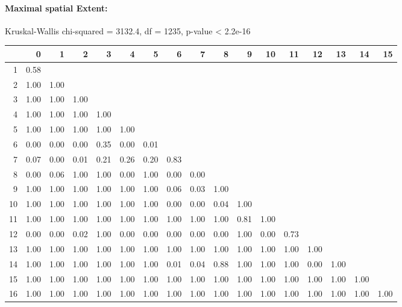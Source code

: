 \paragraph{Maximal spatial Extent:}
Kruskal-Wallis chi-squared = 3132.4, df = 1235, p-value < 2.2e-16

% 
\begin{tabular}{rrrrrrrrrrrrrrrrr}
  \hline
 & 0 & 1 & 2 & 3 & 4 & 5 & 6 & 7 & 8 & 9 & 10 & 11 & 12 & 13 & 14 & 15 \\ 
  \hline
1 & 0.58 &  &  &  &  &  &  &  &  &  &  &  &  &  &  &  \\ 
  2 & 1.00 & 1.00 &  &  &  &  &  &  &  &  &  &  &  &  &  &  \\ 
  3 & 1.00 & 1.00 & 1.00 &  &  &  &  &  &  &  &  &  &  &  &  &  \\ 
  4 & 1.00 & 1.00 & 1.00 & 1.00 &  &  &  &  &  &  &  &  &  &  &  &  \\ 
  5 & 1.00 & 1.00 & 1.00 & 1.00 & 1.00 &  &  &  &  &  &  &  &  &  &  &  \\ 
  6 & 0.00 & 0.00 & 0.00 & 0.35 & 0.00 & 0.01 &  &  &  &  &  &  &  &  &  &  \\ 
  7 & 0.07 & 0.00 & 0.01 & 0.21 & 0.26 & 0.20 & 0.83 &  &  &  &  &  &  &  &  &  \\ 
  8 & 0.00 & 0.06 & 1.00 & 1.00 & 0.00 & 1.00 & 0.00 & 0.00 &  &  &  &  &  &  &  &  \\ 
  9 & 1.00 & 1.00 & 1.00 & 1.00 & 1.00 & 1.00 & 0.06 & 0.03 & 1.00 &  &  &  &  &  &  &  \\ 
  10 & 1.00 & 1.00 & 1.00 & 1.00 & 1.00 & 1.00 & 0.00 & 0.00 & 0.04 & 1.00 &  &  &  &  &  &  \\ 
  11 & 1.00 & 1.00 & 1.00 & 1.00 & 1.00 & 1.00 & 1.00 & 1.00 & 1.00 & 0.81 & 1.00 &  &  &  &  &  \\ 
  12 & 0.00 & 0.00 & 0.02 & 1.00 & 0.00 & 0.00 & 0.00 & 0.00 & 0.00 & 1.00 & 0.00 & 0.73 &  &  &  &  \\ 
  13 & 1.00 & 1.00 & 1.00 & 1.00 & 1.00 & 1.00 & 1.00 & 1.00 & 1.00 & 1.00 & 1.00 & 1.00 & 1.00 &  &  &  \\ 
  14 & 1.00 & 1.00 & 1.00 & 1.00 & 1.00 & 1.00 & 0.01 & 0.04 & 0.88 & 1.00 & 1.00 & 1.00 & 0.00 & 1.00 &  &  \\ 
  15 & 1.00 & 1.00 & 1.00 & 1.00 & 1.00 & 1.00 & 1.00 & 1.00 & 1.00 & 1.00 & 1.00 & 1.00 & 1.00 & 1.00 & 1.00 &  \\ 
  16 & 1.00 & 1.00 & 1.00 & 1.00 & 1.00 & 1.00 & 1.00 & 1.00 & 1.00 & 1.00 & 1.00 & 1.00 & 1.00 & 1.00 & 1.00 & 1.00 \\ 
   \hline
\end{tabular}
